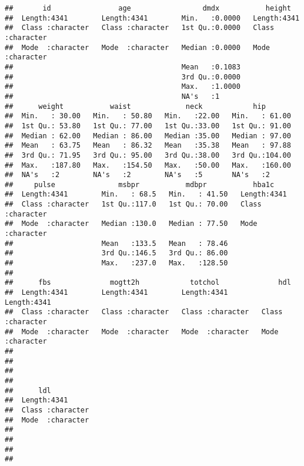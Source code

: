 \documentclass[
]{article}
\begin{document}
\begin{verbatim}
##       id                age                 dmdx           height         
##  Length:4341        Length:4341        Min.   :0.0000   Length:4341       
##  Class :character   Class :character   1st Qu.:0.0000   Class :character  
##  Mode  :character   Mode  :character   Median :0.0000   Mode  :character  
##                                        Mean   :0.1083                     
##                                        3rd Qu.:0.0000                     
##                                        Max.   :1.0000                     
##                                        NA's   :1                          
##      weight           waist             neck            hip        
##  Min.   : 30.00   Min.   : 50.80   Min.   :22.00   Min.   : 61.00  
##  1st Qu.: 53.80   1st Qu.: 77.00   1st Qu.:33.00   1st Qu.: 91.00  
##  Median : 62.00   Median : 86.00   Median :35.00   Median : 97.00  
##  Mean   : 63.75   Mean   : 86.32   Mean   :35.38   Mean   : 97.88  
##  3rd Qu.: 71.95   3rd Qu.: 95.00   3rd Qu.:38.00   3rd Qu.:104.00  
##  Max.   :187.80   Max.   :154.50   Max.   :50.00   Max.   :160.00  
##  NA's   :2        NA's   :2        NA's   :5       NA's   :2       
##     pulse               msbpr           mdbpr           hba1c          
##  Length:4341        Min.   : 68.5   Min.   : 41.50   Length:4341       
##  Class :character   1st Qu.:117.0   1st Qu.: 70.00   Class :character  
##  Mode  :character   Median :130.0   Median : 77.50   Mode  :character  
##                     Mean   :133.5   Mean   : 78.46                     
##                     3rd Qu.:146.5   3rd Qu.: 86.00                     
##                     Max.   :237.0   Max.   :128.50                     
##                                                                        
##      fbs              mogtt2h            totchol              hdl           
##  Length:4341        Length:4341        Length:4341        Length:4341       
##  Class :character   Class :character   Class :character   Class :character  
##  Mode  :character   Mode  :character   Mode  :character   Mode  :character  
##                                                                             
##                                                                             
##                                                                             
##                                                                             
##      ldl           
##  Length:4341       
##  Class :character  
##  Mode  :character  
##                    
##                    
##                    
## 
\end{verbatim}
\end{document}
